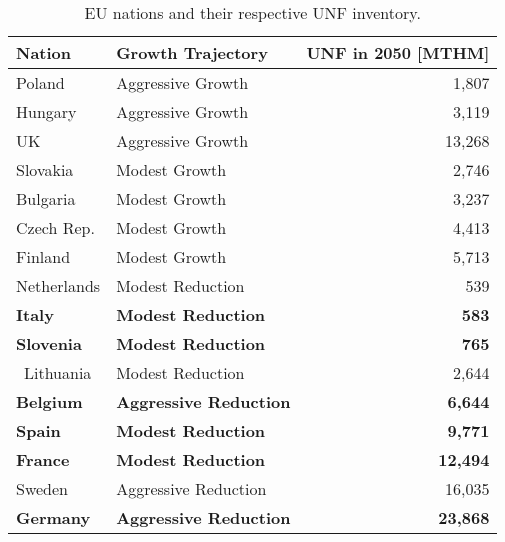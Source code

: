 \begin{table}[h]
    \centering
    \caption {\gls{EU} nations and their respective \gls{UNF} inventory.} 
                \begin{tabularx}{\textwidth}{llr}
                    \hline 
                    \textbf{Nation} & \textbf{Growth Trajectory} & \small{\textbf{UNF in 2050 [MTHM] }}\\
                    \hline
                    Poland & Aggressive Growth & 1,807\\
                    Hungary & Aggressive Growth & 3,119 \\ 
                    UK & Aggressive Growth & 13,268\\
                    Slovakia & Modest Growth & 2,746\\
                    Bulgaria & Modest Growth & 3,237 \\
                    Czech Rep. & Modest Growth & 4,413\\
                    Finland & Modest Growth &  5,713\\
                    Netherlands & Modest Reduction & 539\\
                    \textbf{Italy} & \textbf{Modest Reduction} & \textbf{583}\\
                    \textbf{Slovenia} & \textbf{Modest Reduction} & \textbf{765}\\\
                    Lithuania & Modest Reduction & 2,644 \\
                    \textbf{Belgium} & \textbf{Aggressive Reduction} & \textbf{6,644}\\
                    \textbf{Spain} & \textbf{Modest Reduction} &  \textbf{9,771} \\
                    \textbf{France} & \textbf{Modest Reduction} & \textbf{12,494} \\
                    Sweden & Aggressive Reduction & 16,035\\
                    \textbf{Germany} & \textbf{Aggressive Reduction} & \textbf{23,868}\\
                    \hline
                \end{tabularx}
    
    \label{tab:which_send}

\end{table}

